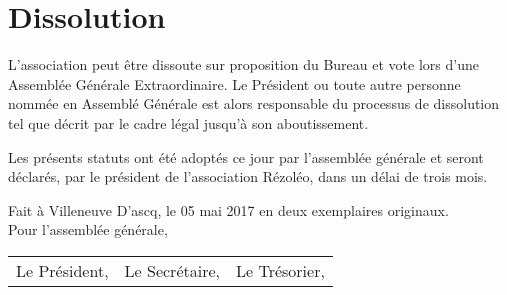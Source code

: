 \documentclass[12pt]{constitution}
\begin{document}
	\section{Dissolution}
	L’association peut être dissoute sur proposition du Bureau et vote lors d'une Assemblée Générale Extraordinaire.
	Le Président ou toute autre personne nommée en Assemblé Générale est alors responsable du processus de dissolution tel que décrit par le cadre légal jusqu’à son aboutissement.
	
	\newpage
	
	Les présents statuts ont été adoptés ce jour par l'assemblée générale et seront déclarés, par le président de l'association Rézoléo, dans un délai de trois mois.
	\begin{flushright}
		Fait à Villeneuve D'ascq, le 05 mai 2017 en deux exemplaires originaux.\\
		Pour l'assemblée générale,
	\end{flushright}
	\begin{tabular}{lll}
		Le Président, & Le Secrétaire, & Le Trésorier, \\
	\end{tabular}
\end{document}
